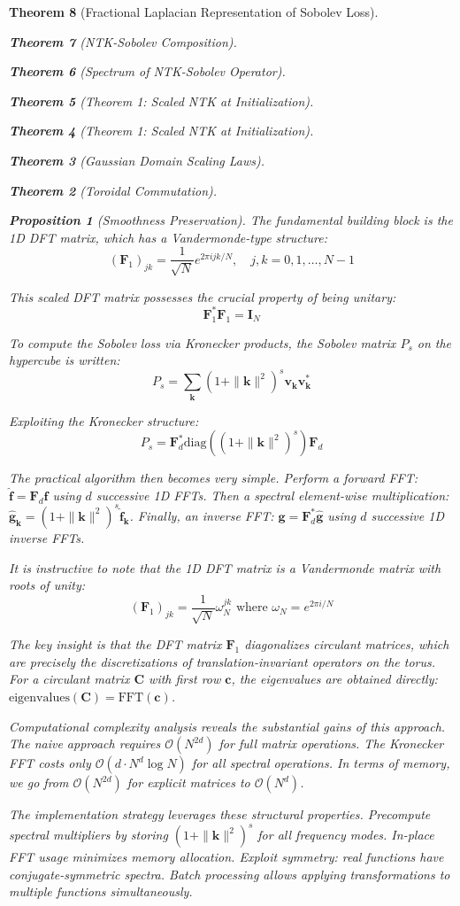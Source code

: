 \documentclass{article}
\newtheorem{theorem}{Theorem}[section]
\newtheorem{proposition}[theorem]{Proposition}
\begin{document}
\begin{theorem}[Fractional Laplacian Representation of Sobolev Loss]
\begin{theorem}[NTK-Sobolev Composition]
\begin{theorem}[Spectrum of NTK-Sobolev Operator]
\begin{theorem}[Theorem 1: Scaled NTK at Initialization]
\begin{theorem}[Theorem 1: Scaled NTK at Initialization]
\begin{theorem}[Gaussian Domain Scaling Laws]
\begin{theorem}[Toroidal Commutation]
\begin{proposition}[Smoothness Preservation]
The fundamental building block is the 1D DFT matrix, which has a Vandermonde-type structure:
\[ (\mathbf{F}_1)_{jk} = \frac{1}{\sqrt{N}} e^{2\pi i jk/N}, \quad j,k = 0, 1, \ldots, N-1 \]

This scaled DFT matrix possesses the crucial property of being unitary:
\[ \mathbf{F}_1^* \mathbf{F}_1 = \mathbf{I}_N \]

To compute the Sobolev loss via Kronecker products, the Sobolev matrix $P_s$ on the hypercube is written:
\[ P_s = \sum_{\mathbf{k}} (1 + \|\mathbf{k}\|^2)^s \mathbf{v}_{\mathbf{k}} \mathbf{v}_{\mathbf{k}}^* \]

Exploiting the Kronecker structure:
\[ P_s = \mathbf{F}_d^* \text{diag}((1 + \|\mathbf{k}\|^2)^s) \mathbf{F}_d \]

The practical algorithm then becomes very simple. Perform a forward FFT: $\hat{\mathbf{f}} = \mathbf{F}_d \mathbf{f}$ using $d$ successive 1D FFTs. Then a spectral element-wise multiplication: $\hat{\mathbf{g}}_{\mathbf{k}} = (1 + \|\mathbf{k}\|^2)^s \hat{\mathbf{f}}_{\mathbf{k}}$. Finally, an inverse FFT: $\mathbf{g} = \mathbf{F}_d^* \hat{\mathbf{g}}$ using $d$ successive 1D inverse FFTs.

It is instructive to note that the 1D DFT matrix is a Vandermonde matrix with roots of unity:
\[ (\mathbf{F}_1)_{jk} = \frac{1}{\sqrt{N}} \omega_N^{jk} \text{ where } \omega_N = e^{2\pi i/N} \]

The key insight is that the DFT matrix $\mathbf{F}_1$ diagonalizes circulant matrices, which are precisely the discretizations of translation-invariant operators on the torus. For a circulant matrix $\mathbf{C}$ with first row $\mathbf{c}$, the eigenvalues are obtained directly: $\text{eigenvalues}(\mathbf{C}) = \text{FFT}(\mathbf{c})$.

Computational complexity analysis reveals the substantial gains of this approach. The naive approach requires $\mathcal{O}(N^{2d})$ for full matrix operations. The Kronecker FFT costs only $\mathcal{O}(d \cdot N^d \log N)$ for all spectral operations. In terms of memory, we go from $\mathcal{O}(N^{2d})$ for explicit matrices to $\mathcal{O}(N^d)$.

The implementation strategy leverages these structural properties. Precompute spectral multipliers by storing $(1 + \|\mathbf{k}\|^2)^s$ for all frequency modes. In-place FFT usage minimizes memory allocation. Exploit symmetry: real functions have conjugate-symmetric spectra. Batch processing allows applying transformations to multiple functions simultaneously.


\end{proposition}
\end{theorem}
\end{theorem}
\end{theorem}
\end{theorem}
\end{theorem}
\end{theorem}
\end{theorem}
\end{document}
